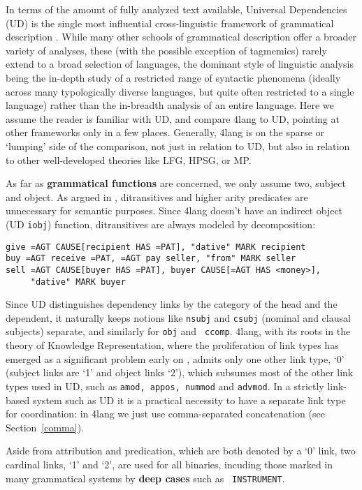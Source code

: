 \documentclass[11pt,bookmarks,bookmarksnumbered,naturalnames,plainpages=false,pdftex,colorlinks=true,urlcolor=blue,bookmarksdepth=subsection,plainpages=false]{paper}
\begin{document}
In terms of the amount of fully analyzed text available, Universal
Dependencies (UD) is the single most influential cross-linguistic framework of
grammatical description \citep{Nivre:2018s}. While many other schools of
grammatical description offer a broader variety of analyses, these (with the
possible exception of tagmemics) rarely extend to a broad selection of
languages, the dominant style of linguistic analysis being the in-depth study
of a restricted range of syntactic phenomena (ideally across many
typologically diverse languages, but quite often restricted to a single
language) rather than the in-breadth analysis of an entire language. Here we
assume the reader is familiar with UD, and compare 4lang to UD, pointing at
other frameworks only in a few places. Generally, 4lang is on the sparse or
`lumping' side of the comparison, not just in relation to UD, but also in
relation to other well-developed theories like LFG, HPSG, or MP.

As far as {\bf grammatical functions} are concerned, we only assume two,
subject and object. As argued in \citep{Kornai:2012}, ditransitives and higher
arity predicates are unnecessary for semantic purposes. Since 4lang doesn't
have an indirect object (UD {\tt iobj}) function, ditransitives are always
modeled by decomposition:

\begin{verbatim}
give =AGT CAUSE[recipient HAS =PAT], "dative" MARK recipient
buy =AGT receive =PAT, =AGT pay seller, "from" MARK seller
sell =AGT CAUSE[buyer HAS =PAT], buyer CAUSE[=AGT HAS <money>], 
     "dative" MARK buyer
\end{verbatim}

\noindent
Since UD distinguishes dependency links by the category of the head and the
dependent, it naturally keeps notions like {\tt nsubj} and {\tt csubj}
(nominal and clausal subjects) separate, and similarly for {\tt obj} and {\tt
  ccomp}. 4lang, with its roots in the theory of Knowledge Representation,
where the proliferation of link types has emerged as a significant problem
early on \citep{Woods:1975}, admits only one other link type, `0' (subject
links are `1' and object links `2'), which subsumes most of the other link
types used in UD, such as {\tt amod, appos, nummod} and {\tt advmod}.  In a
strictly link-based system such as UD it is a practical necessity to have a
separate link type for coordination: in 4lang we just use comma-separated
concatenation (see Section~\ref{comma}). 

Aside from attribution and predication, which are both denoted by a `0' link,
two cardinal links, `1' and `2', are used for all binaries, incuding those
marked in many grammatical systems by {\bf deep cases} such as {\tt
  INSTRUMENT}. 
\end{document}
